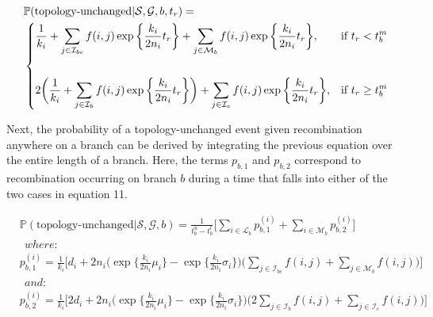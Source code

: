 \documentclass[11pt]{article}
\begin{document}
\begin{equation}
\begin{aligned}
	&\mathbb{P}(\textrm{topology-unchanged} | \mathcal{S},\mathcal{G},b,t_r)=
	\\
	&\begin{dcases}
		\frac{1}{k_i} + 
		\sum_{j \in \mathcal{I}_{bc}} f(i,j) \exp \bigg\{ \frac{k_i}{2n_i}t_r \bigg\} + 
		\sum_{j \in \mathcal{M}_b} f(i,j) \exp \bigg\{ \frac{k_i}{2n_i}t_r \bigg\}, 
		& \text{if } t_r < t_b^m \\
		\\
		2\bigg(
			\frac{1}{k_i} + 
			\sum_{j \in \mathcal{I}_b} f(i,j) \exp \bigg\{ \frac{k_i}{2n_i}t_r \bigg\}
		\bigg) + 
		\sum_{j \in \mathcal{I}_c} f(i,j) \exp\bigg\{ \frac{k_i}{2n_i}t_r \bigg\},
		& \text{if } t_r \ge t_b^m \\
	\end{dcases}
\end{aligned}
\end{equation}


\noindent Next, the probability of a topology-unchanged event given recombination 
anywhere on a branch can be derived by integrating the previous equation 
over the entire length of a branch.
Here, the terms $p_{b,1}$ and $p_{b,2}$ correspond to recombination occurring
on branch $b$ during a time that falls into either of the two cases in equation 11.

\begin{equation}
\begin{aligned}
	&\mathbb{P}(\textrm{topology-unchanged} | \mathcal{S},\mathcal{G},b) = 
	\frac{1}{t_b^u - t_b^l} \Bigg[
		\sum_{i \in \mathcal{L}_b} p_{b,1}^{(i)} + 
		\sum_{i \in \mathcal{M}_b} p_{b,2}^{(i)}
	\Bigg]
	\\
	&~~where: 
	\\
	&p_{b,1}^{(i)} = 
		\frac{1}{k_i} \Bigg[
			d_i + 2n_i \Bigg(
				\exp\bigg\{ \frac{k_i}{2n_i}\mu_i \bigg\} - 
				\exp\bigg\{ \frac{k_i}{2n_i}\sigma_i\bigg\}
			\Bigg)
		\Bigg(
			\sum_{j \in \mathcal{I}_{bc}}f(i,j) + \sum_{j \in \mathcal{M}_b}f(i,j)
		\Bigg)
	\Bigg]
	\\
	&~~and: 
	\\
	&p_{b,2}^{(i)} = 
		\frac{1}{k_i} \Bigg[
			2d_i + 2n_i \Bigg(
				\exp\bigg\{\frac{k_i}{2n_i}\mu_i \bigg\} - 
				\exp\bigg\{\frac{k_i}{2n_i}\sigma_{i} \bigg\}
			\Bigg)
		\Bigg(
			2\sum_{j \in \mathcal{I}_b} f(i,j) + \sum_{j \in \mathcal{I}_c} f(i,j)
		\Bigg)
	\Bigg]
    \end{aligned}
\end{equation}
\end{document}
